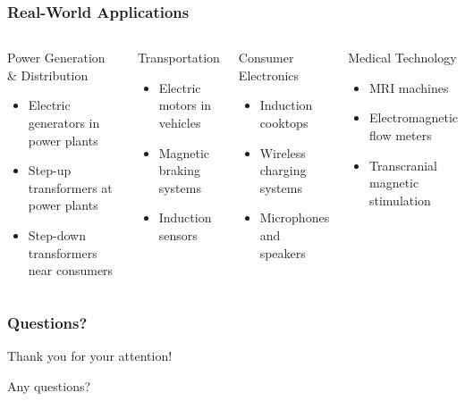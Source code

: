 \documentclass{beamer}
\begin{document}
\begin{frame}
\frametitle{Real-World Applications}
\begin{columns}
\begin{block}{Power Generation \& Distribution}
\begin{itemize}
\item Electric generators in power plants
\item Step-up transformers at power plants
\item Step-down transformers near consumers
\end{itemize}
\end{block}

\begin{block}{Transportation}
\begin{itemize}
\item Electric motors in vehicles
\item Magnetic braking systems
\item Induction sensors
\end{itemize}
\end{block}

\begin{block}{Consumer Electronics}
\begin{itemize}
\item Induction cooktops
\item Wireless charging systems
\item Microphones and speakers
\end{itemize}
\end{block}

\begin{block}{Medical Technology}
\begin{itemize}
\item MRI machines
\item Electromagnetic flow meters
\item Transcranial magnetic stimulation
\end{itemize}
\end{block}
\end{columns}
\end{frame}

\begin{frame}
\frametitle{Questions?}
\begin{center}
\Large Thank you for your attention!

\vspace{1cm}

Any questions?
\end{center}
\end{frame}
\end{document}
